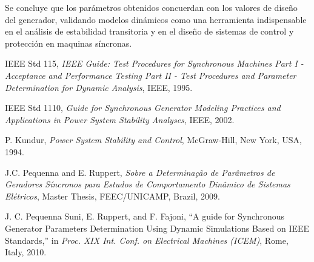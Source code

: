 \documentclass[conference]{IEEEtran}
\begin{document}
Se concluye que los parámetros obtenidos concuerdan con los valores de diseño del generador, validando modelos dinámicos como una herramienta indispensable en el análisis
 de estabilidad transitoria y en el diseño de sistemas de control y protección en maquinas síncronas.
\begin{thebibliography}{plain}

IEEE Std 115, \emph{IEEE Guide: Test Procedures for Synchronous Machines Part I - Acceptance and Performance Testing Part II - Test Procedures and Parameter Determination for Dynamic Analysis}, IEEE, 1995.

IEEE Std 1110, \emph{Guide for Synchronous Generator Modeling Practices and Applications in Power System Stability Analyses}, IEEE, 2002.

P. Kundur, \emph{Power System Stability and Control}, McGraw-Hill, New York, USA, 1994.

J.C. Pequenna and E. Ruppert, \emph{Sobre a Determina\c{c}\~ao de Par\^ametros de Geradores S\'incronos para Estudos de Comportamento Din\^amico de Sistemas El\'etricos}, Master Thesis, FEEC/UNICAMP, Brazil, 2009.

J. C. Pequenna Suni, E. Ruppert, and F. Fajoni, ``A guide for Synchronous Generator Parameters Determination Using Dynamic Simulations Based on IEEE Standards,'' in \emph{Proc. XIX Int. Conf. on Electrical Machines (ICEM)}, Rome, Italy, 2010.

\end{thebibliography}
\end{document}
